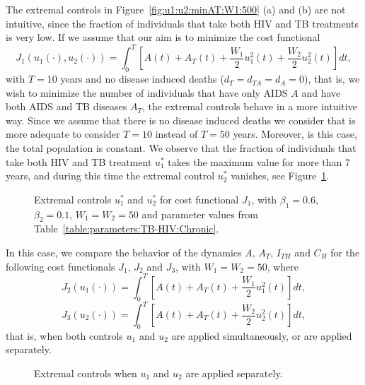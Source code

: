 \documentclass{my_aims}
\theoremstyle{definition}
\begin{document}
The extremal controls in Figure~\ref{fig:u1:u2:minAT:W1:500} (a) and (b) are not intuitive,
since the fraction of individuals that take both HIV and TB treatments is very low.
If we assume that our aim is to minimize the cost functional
\begin{equation}
J_1(u_1(\cdot), u_2(\cdot)) = \int_0^{T} \left[ A(t) + A_T(t)
+ \frac{W_1}{2}u_1^2(t) + \frac{W_2}{2}u_2^2(t) \right] dt,
\end{equation}
with $T = 10$ years and no disease induced deaths ($d_T = d_{TA} = d_A = 0$), that is,
we wish to minimize the number of individuals that have only AIDS $A$ and have both AIDS
and TB diseases $A_T$, the extremal controls behave in a more intuitive way. Since we assume
that there is no disease induced deaths we consider that is more adequate to consider $T = 10$
instead of $T = 50$ years. Moreover, is this case, the total population is constant.
We observe that the fraction of individuals that take both HIV and TB treatment $u_1^*$
takes the maximum value for more than 7 years, and during this time the extremal control
$u_2^*$ vanishes, see Figure~\ref{fig:u1:u2:minAeAT:nodeath}.
\begin{figure}[!htb]
\centering
{}
\caption{Extremal controls $u_1^*$ and $u_2^*$ for cost functional $J_1$,
with $\beta_1 = 0.6$, $\beta_2 = 0.1$, $W_1 = W_2 = 50$ and parameter values
from Table~\ref{table:parameters:TB-HIV:Chronic}.}
\label{fig:u1:u2:minAeAT:nodeath}
\end{figure}
In this case, we compare the behavior of the dynamics $A$, $A_T$, $I_{TH}$ and $C_H$
for the following cost functionals $J_1$, $J_2$ and $J_3$, with $W_1 = W_2 = 50$, where
\begin{equation}
J_2(u_1(\cdot)) = \int_0^{T} \left[ A(t) + A_T(t)
+ \frac{W_1}{2}u_1^2(t) \right] dt,
\end{equation}
\begin{equation}
J_3(u_2(\cdot)) = \int_0^{T} \left[ A(t) + A_T(t)
+ \frac{W_2}{2}u_2^2(t) \right] dt,
\end{equation}
that is, when both controls $u_1$ and $u_2$
are applied simultaneously, or are applied separately.
\begin{figure}[!htb]
\centering
{}
\caption{Extremal controls when $u_1$ and $u_2$ are applied separately.}
\label{fig:only:u1:u2:minAeAT:nodeath}
\end{figure}
\end{document}
